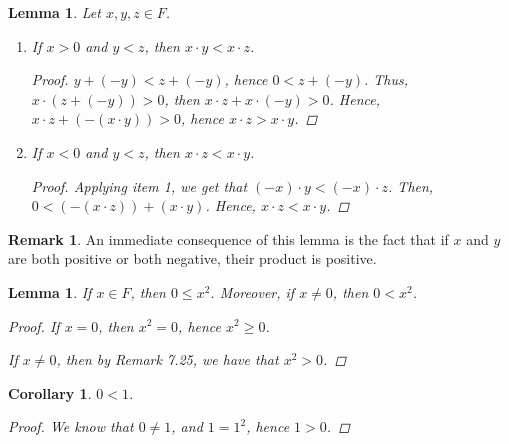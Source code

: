 \documentclass[11pt]{article}
\newtheorem{lemma}[theorem]{Lemma}
\newtheorem{corollary}[theorem]{Corollary}
\theoremstyle{definition}
\newtheorem{remark}[theorem]{Remark}
\numberwithin{equation}{subsection}
\begin{document}
\begin{lemma}
	Let $x,y,z \in F$. 
	\begin{enumerate}
		\item If $x > 0$ and $y < z$, then $x \cdot y < x \cdot z$.
\begin{proof}
$y+(-y)<z+(-y)$, hence $0<z+(-y)$. Thus, $x\cdot (z+(-y))>0$, then $x\cdot z + x \cdot(-y) > 0$. Hence, $x \cdot z+(-(x \cdot y))>0$, hence $x\cdot z > x \cdot y$. 

\renewcommand\qedsymbol{QED}
\end{proof}
		\item If $x < 0$ and $y < z$, then $x \cdot z < x \cdot y$.
\begin{proof}
Applying item 1, we get that $(-x)\cdot y < (-x) \cdot z$. Then, $0<(-(x \cdot z))+(x \cdot y)$. Hence, $x\cdot z<x \cdot y$.

\renewcommand\qedsymbol{QED}
\end{proof}
	\end{enumerate}
	
        



\end{lemma}

\begin{remark} An immediate consequence of this lemma is the fact that if $x$ and $y$ are both positive or both negative, their product is positive.
\end{remark}


\begin{lemma}
	If $x \in F$, then $0 \leq x^2$.  Moreover, if $x \neq 0$, then $0 < x^2$.
        
\begin{proof}
If $x = 0$, then $x^2 = 0$, hence $x^2 \geq 0$.

If $x \neq 0$, then by Remark 7.25, we have that $x^2>0$. 

\renewcommand\qedsymbol{QED}
\end{proof}


\end{lemma}

\begin{corollary}
	$0 < 1$.
        
\begin{proof}
We know that $0 \neq 1$, and $1=1^2$, hence $1>0$.

\renewcommand\qedsymbol{QED}
\end{proof}


\end{corollary}
\end{document}
